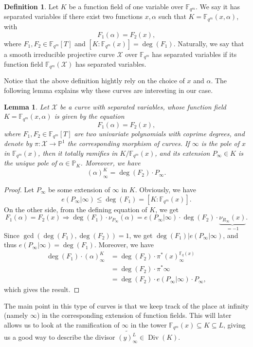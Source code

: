 \documentclass[10pt]{article}
\newtheorem{lem1}[thm]{Lemma}
\theoremstyle{definition}
\theoremstyle{definition}
\theoremstyle{definition}
\newtheorem{def1}[thm]{Definition}
\newcommand{\cd}{\cdot}
\newcommand{\PP}{\mathbb{P}}
\newcommand{\Fqm}{\mathbb{F}_{q^m}}
\newcommand{\Fq}{\mathbb{F}_q}
\newcommand{\su}{\subseteq}
\newcommand{\X}{\mathcal{X}}
\newcommand{\Div}{\operatorname{Div}}
\begin{document}
\begin{def1} \label{courbes a variables separees}
Let $K$ be a function field of one variable over $\Fqm$. We say it has separated variables if there exist two functions $x,\alpha$ such that $K=\Fqm(x,\alpha)$, with
\[F_1(\alpha) = F_2(x),\]
where $F_1,F_2 \in \Fqm[T]$ and $[K:\Fqm(x)] = \deg({F_1})$.
Naturally, we say that a smooth irreducible projective curve $\X$ over $\Fqm$ has separated variables if its function field $\Fqm(\X)$ has separated variables.
\end{def1}

Notice that the above definition hightly rely on the choice of $x$ and $\alpha$. The following lemma explains why these curves are interesting in our case.

\begin{lem1} \label{lemdegre}
Let $\X$ be a curve with separated variables, whose function field $K=\Fqm(x,\alpha)$ is given by the equation
\[F_1(\alpha) = F_2(x),\]
where $F_1,F_2 \in \Fqm[T]$ are two univariate polynomials with coprime degrees, and denote by $\pi : \X \longrightarrow \PP^1$  the corresponding morphism of curves. If $\infty$ is the pole of $x$ in $\Fqm(x)$, then it totally ramifies in $K/\Fqm(x)$, and its extension $P_{\infty} \in K$ is the unique pole of $\alpha \in \PP_K$. Moreover, we have 
\[(\alpha)^K_{\infty} = \deg{(F_2) \cd P_{\infty}}.\]
\end{lem1}

\begin{proof}
Let $P_{\infty}$ be some extension of $\infty$ in $K$. Obviously, we have
\[e(P_{\infty}|\infty) \leq \deg(F_1)=[K:\Fqm(x)].\]
On the other side, from the defining equation of $K$, we get
\[F_1(\alpha) = F_2(x) \Rightarrow \deg(F_1) \cd \nu_{P_{\infty}}(\alpha) = e(P_{\infty}|\infty) \cd \deg(F_2) \cd \underbrace{\nu_{R_{\infty}}(x)}_{=-1}.\]
Since $\gcd(\deg(F_1),\deg( F_2))=1$, we get $\deg(F_1)|e(P_{\infty}|\infty)$, and thus $e(P_{\infty}|\infty)=\deg(F_1)$. Moreover, we have 
\begin{align*}
\deg(F_1) \cd (\alpha)^K_{\infty} &= \deg(F_2) \cd \pi^*(x)^{\Fq(x)}_{\infty} \\
&= \deg(F_2) \cd \pi^*\infty \\
&= \deg(F_2) \cd e(P_{\infty}|\infty) \cd P_{\infty},
\end{align*}
which gives the result.
\end{proof}

The main point in this type of curves is that we keep track of the place at infinity (namely $\infty$) in the corresponding extension of function fields. This will later allows us to look at the ramification of $\infty$ in the tower $\Fqm(x) \su K \su L$, giving us a good way to describe the divisor $\widetilde{(y)_{\infty}^L} \in \Div(K)$.
\end{document}
